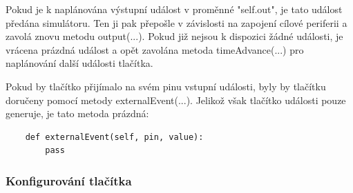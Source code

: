 Pokud je k naplánována výstupní událost v proměnné "self.out", je tato událost předána simulátoru. Ten ji pak přepošle v závislosti na zapojení cílové periferii a zavolá znovu metodu output(...). Pokud již nejsou k dispozici žádné události, je vrácena prázdná událost a opět zavolána metoda timeAdvance(...) pro naplánování další události tlačítka.

Pokud by tlačítko přijímalo na svém pinu vstupní události, byly by tlačítku doručeny pomocí metody externalEvent(...). Jelikož však tlačítko události pouze generuje, je tato metoda prázdná:

\begin{lstlisting}
	def externalEvent(self, pin, value):
		pass
\end{lstlisting}

\subsubsection{Konfigurování tlačítka}

